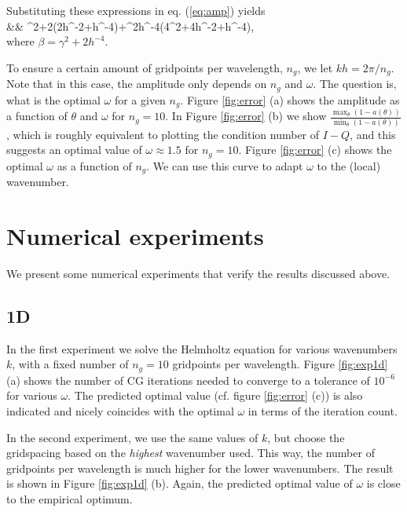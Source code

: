 \documentclass{article}
\begin{document}
Substituting these expressions in eq. (\ref{eq:amp}) yields 
\bq
\label{eq:a1d}
 \nonumber\\
&&
{\beta^2+2\beta\omega(2\gamma h^{-2}\cos\theta+h^{-4}\theta)+\omega^2h^{-4}(4\gamma^2+4\gamma h^{-2}\cos\theta+h^{-4})},\nonumber\\
\eq
where $\beta =  \gamma^2+2h^{-4}$.

To ensure a certain amount of gridpoints per wavelength, $n_g$, we let $kh = 2\pi/n_g$. Note that in 
this case, the amplitude only depends on $n_g$ and $\omega$. The question is, what is the optimal $\omega$
for a given $n_g$. Figure \ref{fig:error} (a) shows the amplitude as a function of $\theta$ and $\omega$ for $n_g=10$.
In Figure \ref{fig:error} (b) we show $\frac{\max_{\theta}(1-a(\theta))}{\min_{\theta}(1-a(\theta))}$, which is roughly equivalent to 
plotting the condition number of $I-Q$, and this suggests an optimal value of $\omega\approx 1.5$ for $n_g=10$.
Figure \ref{fig:error} (c) shows the optimal $\omega$ as a function of $n_g$. 
We can use this curve to adapt $\omega$ to the (local) wavenumber.

\section{Numerical experiments}
We present some numerical experiments that verify the results discussed above.

\subsection{1D}
In the first experiment
we solve the Helmholtz equation for various wavenumbers $k$, with a fixed number of $n_g=10$ gridpoints per wavelength. 
Figure \ref{fig:exp1d} (a) shows the number of CG iterations needed to converge to a tolerance of $10^{-6}$ for various 
$\omega$. The predicted optimal value (cf. figure \ref{fig:error} (c)) is also indicated and nicely coincides with 
the optimal $\omega$ in terms of the iteration count.

In the second experiment, we use the same values of $k$, but choose the gridspacing
based on the \emph{highest} wavenumber used. This way, the number of gridpoints per
wavelength is much higher for the lower wavenumbers. The result is shown in Figure \ref{fig:exp1d} (b). 
Again, the predicted optimal value of $\omega$ is close to the empirical optimum.
\end{document}
